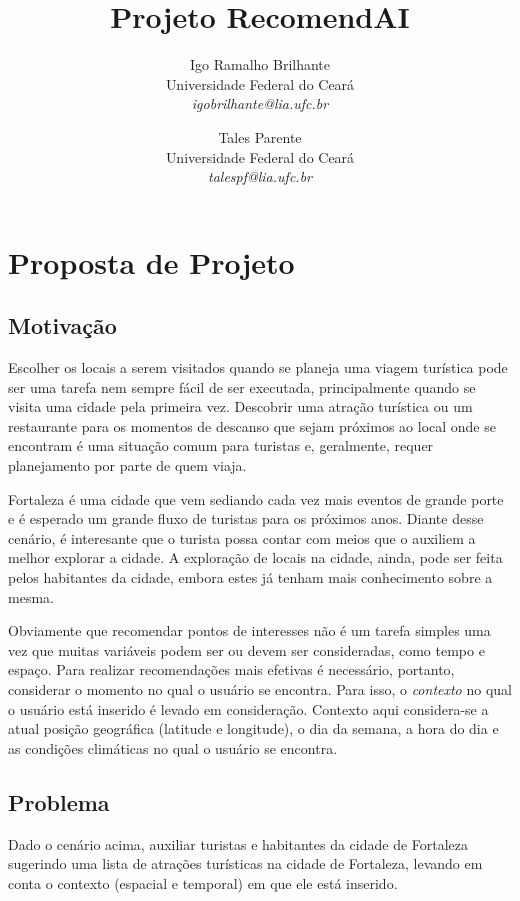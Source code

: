 \documentclass[10pt,a4paper,twocolumn]{article}
\author{Igo Ramalho Brilhante \\ \small{Universidade Federal do Ceará} \\  \small{\textit{igobrilhante@lia.ufc.br}} \and Tales Parente \\  \small{Universidade Federal do Ceará} \\ \small{\textit{talespf@lia.ufc.br}} }
\title{Projeto RecomendAI}
\begin{document}
\maketitle

\section{Proposta de Projeto}

\subsection{Motivação}
Escolher os locais a serem visitados quando se planeja uma viagem turística pode ser uma tarefa nem sempre fácil de ser executada, principalmente quando se visita uma cidade pela primeira vez. Descobrir uma atração turística ou um restaurante para os momentos de descanso que sejam próximos ao local onde se encontram é uma situação comum para turistas e, geralmente, requer planejamento por parte de quem viaja.

Fortaleza é uma cidade que vem sediando cada vez mais eventos de grande porte e é esperado um grande fluxo de turistas para os próximos anos. Diante desse cenário, é interesante que o turista possa contar com meios que o auxiliem a melhor explorar a cidade. A exploração de locais na cidade, ainda, pode ser feita pelos habitantes da cidade, embora estes já tenham mais conhecimento sobre a mesma.

Obviamente que recomendar pontos de interesses não é um tarefa simples uma vez que muitas variáveis podem ser ou devem ser consideradas, como tempo e espaço. Para realizar recomendações mais efetivas é necessário, portanto, considerar o momento no qual o usuário se encontra. Para isso, o \emph{contexto} no qual o usuário está inserido é levado em consideração. Contexto aqui considera-se a atual posição geográfica (latitude e longitude), o dia da semana, a hora do dia e as condições climáticas no qual o usuário se encontra.

\subsection{Problema}
Dado o cenário acima, auxiliar turistas e habitantes da cidade de Fortaleza sugerindo uma lista de atrações turísticas na cidade de Fortaleza, levando em conta o contexto (espacial e temporal) em que ele está inserido.
	
\end{document}
